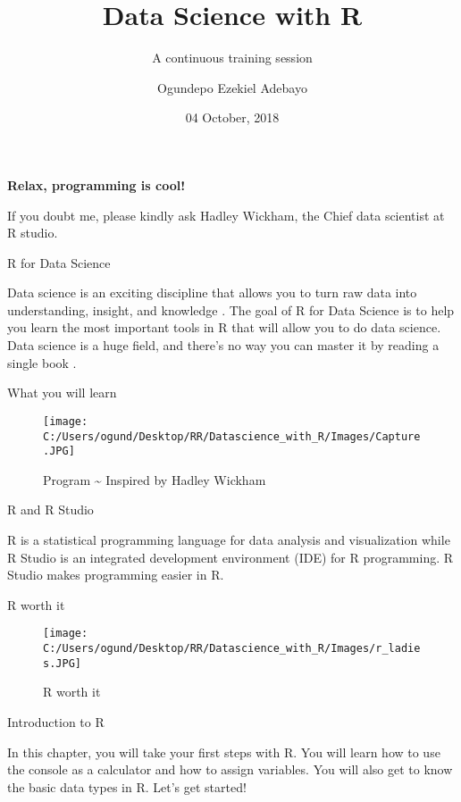 \documentclass[ignorenonframetext,]{beamer}
\title{Data Science with R}
\subtitle{A continuous training session}
\author{Ogundepo Ezekiel Adebayo}
\date{04 October, 2018}
\begin{document}
\frame{\titlepage}

\begin{frame}

\begin{center}
\textbf{Relax, programming is cool!}
\end{center}

If you doubt me, please kindly ask Hadley Wickham, the Chief data
scientist at R studio.

\end{frame}

\begin{frame}{R for Data Science}

Data science is an exciting discipline that allows you to turn raw data
into understanding, insight, and knowledge \cite{P}. The goal of R for
Data Science is to help you learn the most important tools in R that
will allow you to do data science. Data science is a huge field, and
there's no way you can master it by reading a single book \cite{P}.

\end{frame}

\begin{frame}{What you will learn}

\begin{figure}
\centering
\texttt{[image: C:/Users/ogund/Desktop/RR/Datascience\_with\_R/Images/Capture.JPG]}
\caption{Program \textasciitilde{} Inspired by Hadley Wickham \cite{P}}
\end{figure}

\begin{block}{R and R Studio}

R is a statistical programming language for data analysis and
visualization while R Studio is an integrated development environment
(IDE) for R programming. R Studio makes programming easier in R.

\end{block}

\end{frame}

\begin{frame}{R worth it}

\begin{figure}
\centering
\texttt{[image: C:/Users/ogund/Desktop/RR/Datascience\_with\_R/Images/r\_ladies.JPG]}
\caption{R worth it}
\end{figure}

\end{frame}

\begin{frame}{Introduction to R}

In this chapter, you will take your first steps with R. You will learn
how to use the console as a calculator and how to assign variables. You
will also get to know the basic data types in R. Let's get started!

\end{frame}
\end{document}
